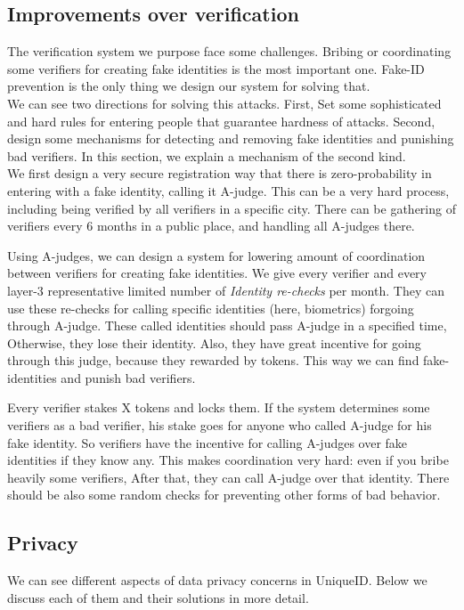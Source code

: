 \documentclass[conference]{IEEEtran}
\begin{document}
\subsection{Improvements over verification}
The verification system we purpose face some challenges. Bribing or coordinating some verifiers for creating fake identities is the most important one. Fake-ID prevention is the only thing we design our system for solving that. \\
We can see two directions for solving this attacks. First, Set some sophisticated and hard rules for entering people that guarantee hardness of attacks. Second, design some mechanisms for detecting and removing fake identities and punishing bad verifiers. In this section, we explain a mechanism of the second kind. \\
We first design a very secure registration way that there is zero-probability in entering with a fake identity, calling it A-judge. This can be a very hard process, including being verified by all verifiers in a specific city. There can be gathering of verifiers every 6 months in a public place, and handling all A-judges there.


Using A-judges, we can design a system for lowering amount of coordination between verifiers for creating fake identities. We give every verifier and every layer-3 representative limited number of \textit{Identity re-checks} per month. They can use these re-checks for calling specific identities (here, biometrics) forgoing through A-judge. These called identities should pass A-judge in a specified time, Otherwise, they lose their identity. Also, they have great incentive for going through this judge, because they rewarded by tokens. This way we can find fake-identities and punish bad verifiers.


Every verifier stakes X tokens and locks them. If the system determines some verifiers as a bad verifier, his stake goes for anyone who called A-judge for his fake identity. So verifiers have the incentive for calling A-judges over fake identities if they know any. This makes coordination very hard: even if you bribe heavily some verifiers, After that, they can call A-judge over that identity. There should be also some random checks for preventing other forms of bad behavior.

\subsection{Privacy}
We can see different aspects of data privacy concerns in UniqueID. Below we discuss each of them and their solutions in more detail.
\end{document}
